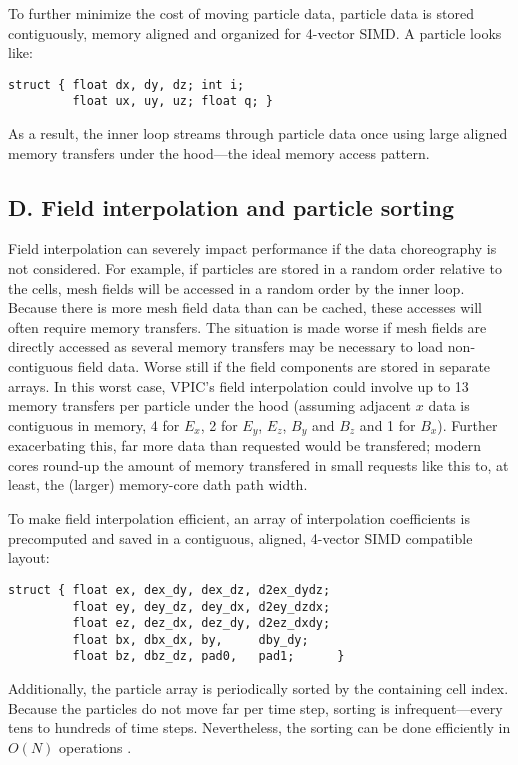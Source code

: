 \documentclass[letter,10pt]{article}
\begin{document}
To further minimize the cost of moving particle data, particle data is
stored contiguously, memory aligned and organized for 4-vector SIMD.
A particle looks like:
\begin{verbatim}
struct { float dx, dy, dz; int i;
         float ux, uy, uz; float q; }
\end{verbatim}
As a result, the inner loop streams through particle data once using
large aligned memory transfers under the hood---the ideal memory
access pattern.

\subsection{D. Field interpolation and particle sorting}

Field interpolation can severely impact performance if the data
choreography is not considered.  For example, if particles are stored
in a random order relative to the cells, mesh fields will be accessed
in a random order by the inner loop.  Because there is more mesh field
data than can be cached, these accesses will often require memory
transfers.  The situation is made worse if mesh fields are directly
accessed as several memory transfers may be necessary to load
non-contiguous field data.  Worse still if the field components are
stored in separate arrays.  In this worst case, VPIC's field
interpolation could involve up to 13 memory transfers per particle
under the hood (assuming adjacent $x$ data is contiguous in memory, 4
for $E_x$, 2 for $E_y$, $E_z$, $B_y$ and $B_z$ and 1 for $B_x$).
Further exacerbating this, far more data than requested would be
transfered; modern cores round-up the amount of memory transfered in
small requests like this to, at least, the (larger) memory-core dath
path width.

To make field interpolation efficient, an array of interpolation
coefficients is precomputed and saved in a contiguous, aligned,
4-vector SIMD compatible layout:
\begin{verbatim}
struct { float ex, dex_dy, dex_dz, d2ex_dydz;
         float ey, dey_dz, dey_dx, d2ey_dzdx;
         float ez, dez_dx, dez_dy, d2ez_dxdy;
         float bx, dbx_dx, by,     dby_dy;
         float bz, dbz_dz, pad0,   pad1;      }
\end{verbatim}
Additionally, the particle array is periodically sorted by the
containing cell index.  Because the particles do not move far per time
step, sorting is infrequent---every tens to hundreds of time steps.
Nevertheless, the sorting can be done efficiently in $O(N)$ operations
\cite{Bowers_2001}.
\end{document}

